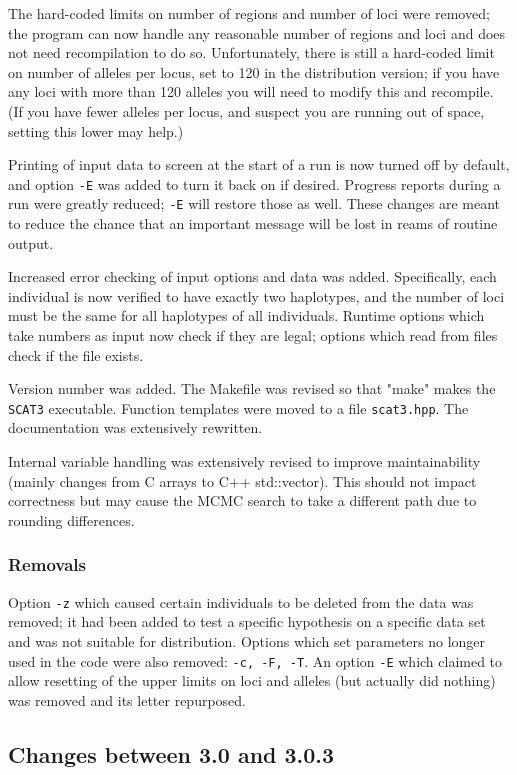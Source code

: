 \documentclass[10pt,titlepage,times,letterpaper]{article}
\def\SCAT{{\tt SCAT3} }
\begin{document}
The hard-coded limits on number of regions and number of loci were removed; 
the program can now handle any reasonable number of regions and loci and does not need
recompilation to do so.  Unfortunately, there is still a hard-coded limit
on number of alleles per locus, set to 120 in the distribution version; if you
have any loci with more than 120 alleles you will need to modify this and
recompile.  (If you have fewer alleles per locus, and suspect you are
running out of space, setting this lower may help.)

Printing of input data to screen at the start of a run is now turned off
by default, and option {\tt -E} was added to turn it back on if desired.
Progress reports during a run were greatly reduced; {\tt -E} will
restore those as well.  These changes are
meant to reduce the chance that an important message will be
lost in reams of routine output.

Increased error checking of input options and data was added.  Specifically,
each individual is now verified to have exactly two haplotypes, and the
number of loci must be the same for all haplotypes of all individuals.
Runtime options which take numbers as input now check if they are legal;
options which read from files check if the file exists.

Version number was added.  The Makefile was revised so that "make" makes 
the \SCAT executable.  Function templates were moved to a file {\tt scat3.hpp}.
The documentation was extensively rewritten.

Internal variable handling was extensively revised to improve maintainability
(mainly changes from C arrays to C++ std::vector).
This should not impact correctness but may cause the MCMC search to take a
different path due to rounding differences.

\subsubsection{Removals}
Option {\tt -z} which caused certain individuals to be deleted
from the data was removed; it had been added to test a specific hypothesis
on a specific data set and was not suitable for distribution.
Options which set parameters no longer used in the code were
also removed:  {\tt -c, -F, -T}.  An option {\tt -E} which claimed
to allow resetting of the upper limits on loci and alleles (but
actually did nothing) was removed and its letter repurposed.

\subsection{Changes between 3.0 and 3.0.3}
\end{document}
